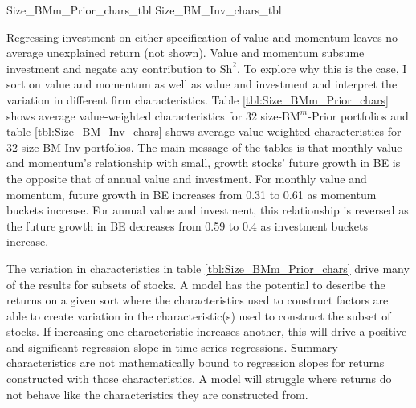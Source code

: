 
{Size_BMm_Prior_chars_tbl}
{Size_BM_Inv_chars_tbl}

Regressing investment on either specification of value and momentum
leaves no average unexplained return (not shown).
Value and momentum subsume investment and negate any contribution to
$\text{Sh}^2$.
To explore why this is the case, I sort on value and momentum as well as
value and investment and interpret the variation in different firm
characteristics.
Table \ref{tbl:Size_BMm_Prior_chars} shows average value-weighted
characteristics for 32 size-$\text{BM}^m$-Prior portfolios and table
\ref{tbl:Size_BM_Inv_chars} shows average value-weighted characteristics for 32
size-BM-Inv portfolios. The main message of the tables is that monthly value
and momentum's relationship with small, growth stocks' future growth in BE is
the opposite that of annual value and investment. For monthly value and
momentum, future growth in BE increases from 0.31 to 0.61 as momentum buckets
increase. For annual value and investment, this relationship is reversed as the
future growth in BE decreases from 0.59 to 0.4 as investment buckets increase.

The variation in characteristics in table \ref{tbl:Size_BMm_Prior_chars} drive
many of the results for subsets of stocks.
A model has the potential to describe the
returns on a given sort where the characteristics used to construct factors are
able to create variation in the characteristic(s) used to construct the subset
of stocks. If increasing one characteristic increases another, this will drive
a positive and significant regression slope in time series regressions.
Summary characteristics are not mathematically bound to
regression slopes for returns constructed with those characteristics.
A model will struggle where returns do not behave like the characteristics they
are constructed from.

